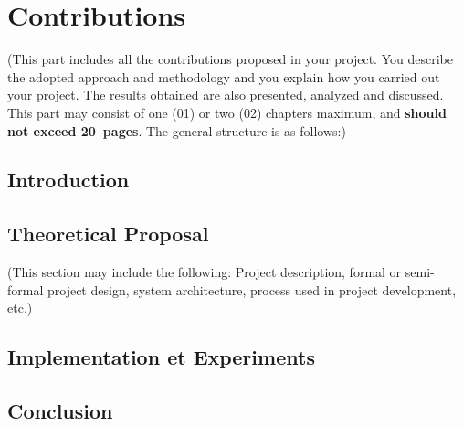 \chapter{Contributions} \label{chap:contributions}

(This part includes all the contributions proposed in your project. You describe the adopted approach and methodology and you explain how you carried out your project. The results obtained are also presented, analyzed and discussed. This part may consist of one (01) or two (02) chapters maximum, and \textbf{should not exceed 20~pages}. The general structure is as follows:)

\section*{Introduction}

\section{Theoretical Proposal}
(This section may include the following: Project description, formal or semi-formal project design, system architecture, process used in project development, etc.)

\section{Implementation et Experiments}
\section*{Conclusion}